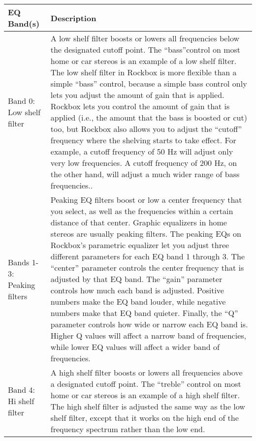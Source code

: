 {  \begin{table}
  \begin{center}
  \begin{tabularx}{\textwidth}{lX}\toprule
      \textbf{EQ Band(s)} & \textbf{Description} \\\midrule
        Band 0:  Low shelf filter
        & A low shelf filter boosts or lowers all frequencies below the 
        designated cutoff point. The ``bass''control on most home or car 
        stereos is an example of a low shelf filter. The low shelf 
        filter in Rockbox is more flexible than a simple ``bass'' 
        control, because a simple bass control only lets you adjust 
        the amount of gain that is applied. Rockbox lets you control 
        the amount of gain that is applied (i.e., the amount that the 
        bass is boosted or cut) too, but Rockbox also allows you to 
        adjust the ``cutoff'' frequency where the shelving starts to take 
        effect. For example, a cutoff frequency of 50 Hz will adjust only very 
        low frequencies. A cutoff frequency of 200 Hz, on the other hand, will 
        adjust a much wider range of bass frequencies.. \\
        Bands 1-3:  Peaking filters
        & Peaking EQ filters boost or low a center frequency that you select, 
        as well as the frequencies within a certain distance of that 
        center. Graphic equalizers in home stereos are usually peaking
        filters. The peaking EQs on Rockbox's parametric equalizer let
        you adjust three different parameters for each EQ band 1 
        through 3.  The ``center'' parameter controls the center 
        frequency that is adjusted by that EQ band. The ``gain'' 
        parameter controls how much each band is adjusted. Positive 
        numbers make the EQ band louder, while negative numbers make 
        that EQ band quieter. Finally, the ``Q'' parameter controls how wide 
        or narrow each EQ band is. Higher Q values will affect a 
        narrow band of frequencies, while lower EQ values will affect 
        a wider band of frequencies. \\
        Band 4:  Hi shelf filter
        & A high shelf filter boosts or lowers all frequencies above a 
        designated cutoff point. The ``treble'' control on most home or car 
        stereos is an example of a high shelf filter. The high shelf filter is 
        adjusted the same way as the low shelf filter, except that it works on 
        the high end of the frequency spectrum rather than the low end.\\
        \bottomrule
  \end{tabularx}
  \end{center}
  \end{table}
   
}
